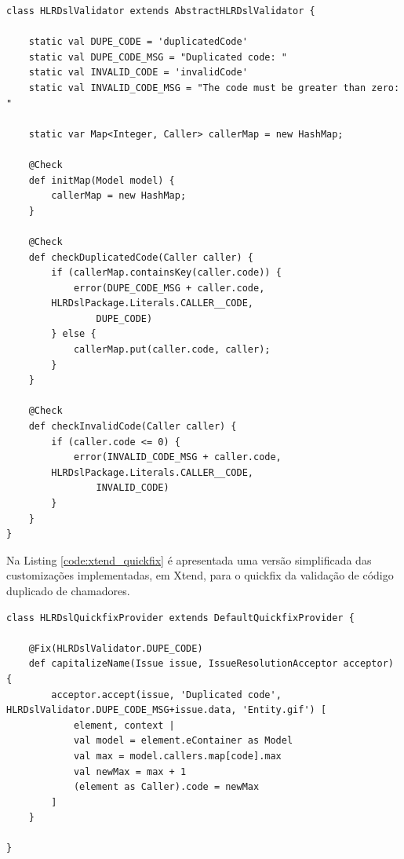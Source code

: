 \begin{small}
\begin{lstlisting}[frame=single, language=Xtend, caption={\it Validation Customization}, label={code:xtend_validation}]
class HLRDslValidator extends AbstractHLRDslValidator {

	static val DUPE_CODE = 'duplicatedCode'
	static val DUPE_CODE_MSG = "Duplicated code: "
	static val INVALID_CODE = 'invalidCode'
	static val INVALID_CODE_MSG = "The code must be greater than zero: "

	static var Map<Integer, Caller> callerMap = new HashMap;

	@Check
	def initMap(Model model) {
		callerMap = new HashMap; 
	}

	@Check
	def checkDuplicatedCode(Caller caller) {
		if (callerMap.containsKey(caller.code)) {
			error(DUPE_CODE_MSG + caller.code, 
        HLRDslPackage.Literals.CALLER__CODE,
				DUPE_CODE)
		} else {
			callerMap.put(caller.code, caller);
		}
	}

	@Check
	def checkInvalidCode(Caller caller) {
		if (caller.code <= 0) {
			error(INVALID_CODE_MSG + caller.code, 
        HLRDslPackage.Literals.CALLER__CODE,
				INVALID_CODE)
		}
	}
}	
\end{lstlisting}
\end{small}



Na Listing \ref{code:xtend_quickfix} é apresentada uma versão simplificada das customizações implementadas, em Xtend, para o quickfix da validação de código duplicado de chamadores.


\begin{small}
\begin{lstlisting}[frame=single, language=Xtend, caption={\it Quickfix Customization}, label={code:xtend_quickfix}]
class HLRDslQuickfixProvider extends DefaultQuickfixProvider {

	@Fix(HLRDslValidator.DUPE_CODE)
	def capitalizeName(Issue issue, IssueResolutionAcceptor acceptor) {
		acceptor.accept(issue, 'Duplicated code', HLRDslValidator.DUPE_CODE_MSG+issue.data, 'Entity.gif') [
			element, context |
			val model = element.eContainer as Model
			val max = model.callers.map[code].max
			val newMax = max + 1			
			(element as Caller).code = newMax
		]
	}
	
}
\end{lstlisting}
\end{small}



